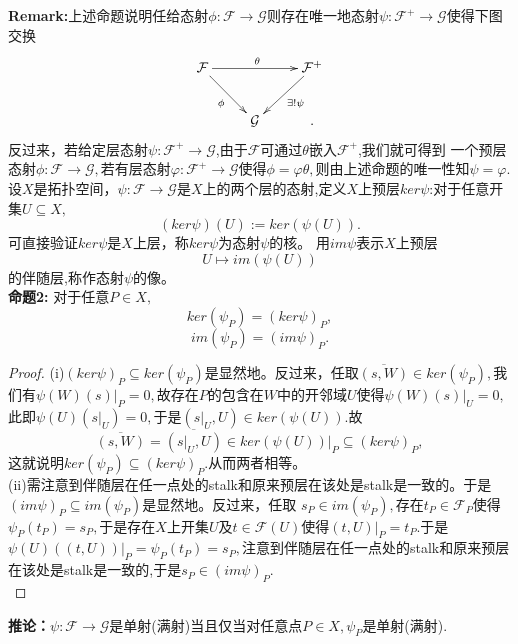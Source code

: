 \documentclass[UTF8]{article}
\begin{document}
\textbf{Remark:}上述命题说明任给态射$\phi :\mathcal{F}\rightarrow \mathcal{G}$则存在唯一地态射$\psi:\mathcal{F}^{+}\rightarrow \mathcal{G}$使得下图交换
 $$
\xymatrix{
	\mathcal{F}\ar[rr]^{\theta}\ar[dr]_{\phi}& &\mathcal{F}^{+} \ar[dl]^{\exists !\psi}\\
	& \mathcal{G}&
	.}
$$
反过来，若给定层态射$\psi :\mathcal{F}^{+}\rightarrow \mathcal{G}$,由于$\mathcal{F}$可通过$\theta$嵌入$\mathcal{F}^{+}$,我们就可得到
一个预层态射$\phi :\mathcal{F}\rightarrow \mathcal{G},$若有层态射$\varphi:\mathcal{F}^{+}\rightarrow \mathcal{G}$使得$\phi=\varphi \theta,$则由上述命题的唯一性知$\psi=\varphi.$\\

设$X$是拓扑空间，$\psi:\mathcal{F}\rightarrow \mathcal{G}$是$X$上的两个层的态射,定义$X$上预层$ker\psi$:对于任意开集$U\subseteq X,$
$$
(ker\psi)(U):=ker(\psi(U)).
$$
可直接验证$ker\psi$是$X$上层，称$ker\psi$为态射$\psi$的核。
用$im\psi$表示$X$上预层
$$
U\mapsto im(\psi(U))
$$
的伴随层,称作态射$\psi$的像。\\
\textbf{命题2:}
对于任意$P\in X,$
$$
ker(\psi_{P})=(ker\psi)_{P},$$
$$
im(\psi_{P})=(im\psi)_{P}.
$$
\begin{proof}
	(i)$(ker\psi)_{P}\subseteq ker(\psi_{P})$是显然地。反过来，任取$\overline{(s,W)}\in ker(\psi_{P}),$我们有$\psi(W)(s)|_{P}=0,$故存在$P$的包含在$W$中的开邻域$U$使得$\psi(W)(s)|_{U}=0,$此即$\psi(U)(s|_{U})=0,$于是$(s|_{U},U)\in ker(\psi(U))$.故
	$$
	\overline{(s,W)}=\overline{(s|_{U},U)}\in ker(\psi(U))|_{P}\subseteq (ker\psi)_{P},
	$$
	这就说明$ker(\psi_{P}) \subseteq (ker\psi)_{P}.$从而两者相等。\\
	(ii)需注意到伴随层在任一点处的stalk和原来预层在该处是stalk是一致的。于是$(im\psi)_{P}\subseteq im(\psi_{P})$是显然地。反过来，任取
	$s_{P}\in im(\psi_{P}),$存在$t_{P}\in \mathcal{F}_{P}$使得$\psi_{P}(t_{P})=s_{P},$于是存在$X$上开集$U$及$t\in \mathcal{F}(U)$使得$(t,U)|_{P}=t_{P}$.于是$\psi(U)((t,U))|_{P}=\psi_{P}(t_{P})=s_{P},$注意到伴随层在任一点处的stalk和原来预层在该处是stalk是一致的,于是$s_{P}\in (im\psi)_{P}.$\\
\end{proof}
\textbf{推论：}$\psi:\mathcal{F}\rightarrow \mathcal{G}$是单射(满射)当且仅当对任意点$P\in X,\psi_{P}$是单射(满射).\\
\end{document}
